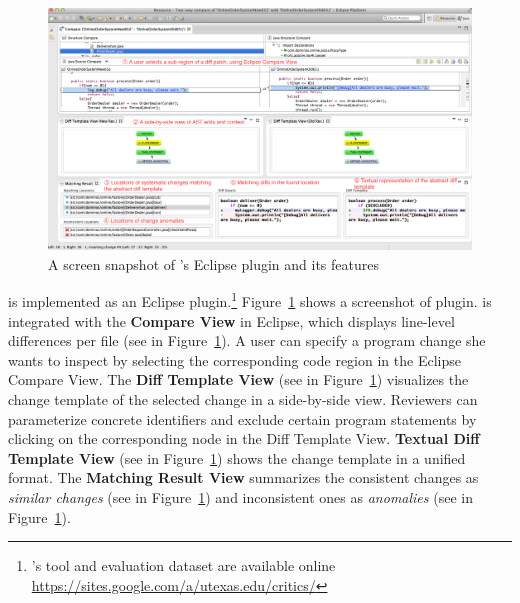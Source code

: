 \documentclass[runningheads,a4paper]{llncs}
\begin{document}
\begin{figure}[ht]
 \centering
 \includegraphics[width=\textwidth]{images/critics-UI.pdf}
 \caption{A screen snapshot of {\critics}'s Eclipse plugin and its features}
 \label{fig:critics-UI}
\end{figure}
{\critics} is implemented as an Eclipse plugin.\footnote{{\critics}'s tool and evaluation dataset are available online \url{https://sites.google.com/a/utexas.edu/critics/}} Figure~\ref{fig:critics-UI} shows a screenshot of {\critics} plugin. {\critics} is integrated with the {\bf Compare View} in Eclipse, which displays line-level differences per file (see  in Figure~\ref{fig:critics-UI}). A user can specify a program change she wants to inspect by selecting the corresponding code region in the Eclipse Compare View. The {\bf Diff Template View} (see  in Figure~\ref{fig:critics-UI}) visualizes the change template of the selected change in a side-by-side view. Reviewers can parameterize concrete identifiers and exclude certain program statements by clicking on the corresponding node in the Diff Template View. {\bf Textual Diff Template View} (see  in Figure~\ref{fig:critics-UI}) shows the change template in a unified format. The {\bf Matching Result View} summarizes the consistent changes as {\em similar changes} (see  in Figure~\ref{fig:critics-UI}) and inconsistent ones as {\em anomalies} (see  in Figure~\ref{fig:critics-UI}).
\end{document}
